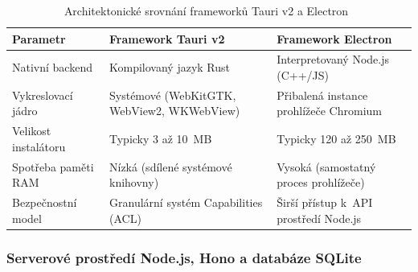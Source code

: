 \documentclass[12pt, a4paper, oneside]{article}
\begin{document}
\begin{table}[H]
    \centering
    \begin{tabular}{@{}>{\raggedright\arraybackslash}p{4.0cm}>{\raggedright\arraybackslash}p{5.3cm}>{\raggedright\arraybackslash}p{5.3cm}@{}}
        \toprule
        \textbf{Parametr} & \textbf{Framework Tauri v2} & \textbf{Framework Electron} \\
        \midrule
        Nativní backend & Kompilovaný jazyk Rust & Interpretovaný Node.js (C++/JS) \\
        Vykreslovací jádro & Systémové (WebKitGTK, WebView2, WKWebView) & Přibalená instance prohlížeče Chromium \\
        Velikost instalátoru & Typicky 3 až 10~MB & Typicky 120 až 250~MB \\
        Spotřeba paměti RAM & Nízká (sdílené systémové knihovny) & Vysoká (samostatný proces prohlížeče) \\
        Bezpečnostní model & Granulární systém Capabilities (ACL) & Širší přístup k~API prostředí Node.js \\
        \bottomrule
    \end{tabular}
    \caption{Architektonické srovnání frameworků Tauri v2 a Electron~\cite{tauri_docs}}
    \label{tab:tauri_vs_electron}
\end{table}

\subsubsection{Serverové prostředí Node.js, Hono a databáze SQLite}
\label{sec:teorie_backend}
\end{document}
